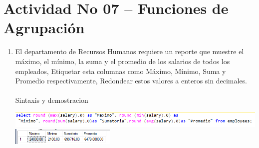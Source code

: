 \section{Actividad No 07 – Funciones de Agrupaci\'on} 
		
\begin{enumerate}[1.]
	\item El departamento de Recursos Humanos requiere un reporte que muestre el máximo, el mínimo, la suma y el promedio de los salarios de todos los empleados, Etiquetar esta columnas como Máximo, Mínimo, Suma y Promedio respectivamente, Redondear estos valores a enteros sin decimales.
	\\
	\\Sintaxis y demostracion
    	\begin{center}
	\includegraphics[width=15cm]{./Imagenes/71} 
	\includegraphics[width=5cm]{./Imagenes/712} 
	\end{center}


\end{enumerate}

